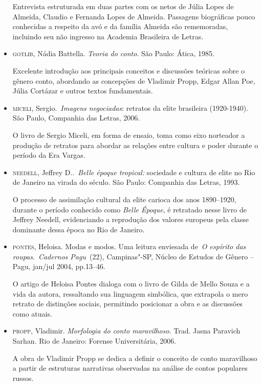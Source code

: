 \documentclass[12pt]{extarticle}
\begin{document}
\begin{itemize}
Entrevista estruturada em duas partes com os netos de Júlia Lopes de
Almeida, Claudio e Fernanda Lopes de Almeida. Passagens biográficas
pouco conhecidas a respeito da avó e da família Almeida são
rememoradas, incluindo seu não ingresso na Academia Brasileira de
Letras.

\item\textsc{gotlib}, Nádia Battella. \emph{Teoria do conto}. São Paulo: Ática,
1985. 

Excelente introdução aos principais conceitos e discussões
teóricas sobre o gênero conto, abordando as concepções de Vladimir
Propp, Edgar Allan Poe, Júlia Cortázar e outros textos fundamentais.

\item\textsc{miceli}, Sergio.~\textit{Imagens negociadas}: retratos da elite
brasileira (1920-1940). São Paulo, Companhia das Letras, 2006.

O livro de Sergio Miceli, em forma de ensaio, toma como eixo norteador a produção de 
retratos para abordar as relações entre cultura e poder durante o período da Era Vargas.

\item\textsc{needell}, Jeffrey D..~\emph{Belle époque tropical:} sociedade
e cultura de elite no Rio de Janeiro na virada do século. São
Paulo: Companhia das Letras, 1993.

O processo de assimilação cultural da elite carioca dos anos 1890--1920, durante o 
período conhecido como \textit{Belle Époque}, é retratado nesse livro de Jeffrey Needell, evidenciando 
a reprodução dos valores europeus pela classe dominante dessa época no Rio de Janeiro.

\item\textsc{pontes}, Heloisa. Modas e modos. Uma leitura enviesada de~\emph{O
espírito das roupas}.~\textit{Cadernos Pagu}~(22), Campinas"-SP, Núcleo
de Estudos de Gênero -- Pagu, jan/jul 2004, pp.13--46.

O artigo de Heloisa Pontes dialoga com o livro de Gilda de Mello Souza e  
a vida da autora, ressaltando sua linguagem simbólica, que extrapola 
o mero retrato de distinções sociais, permitindo posicionar a obra e as discussões 
como atuais. 

\item\textsc{propp}, Vladimir. \emph{Morfologia do conto maravilhoso}. Trad. Jasna
Paravich Sarhan. Rio de Janeiro: Forense Universitária, 2006. 

A obra de Vladimir Propp se dedica a definir o conceito de conto maravilhoso
a partir de estruturas narrativas observadas na análise de contos
populares russos.
\end{itemize}
\end{document}
